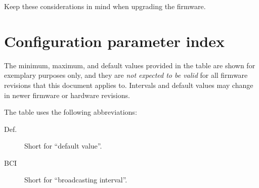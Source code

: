 \documentclass{zubaxdoc}
\begin{document}
Keep these considerations in mind when upgrading the firmware.

\section{Configuration parameter index}

The minimum, maximum, and default values provided in the table are shown for exemplary purposes only,
and they are \emph{not expected to be valid} for all firmware revisions that this document applies to.
Intervals and default values may change in newer firmware or hardware revisions.

The table uses the following abbreviations:
\begin{description}
\item[Def.] Short for ``default value''.
\item[BCI] Short for ``broadcasting interval''.
\end{description}

\newcommand\CfgParamIndexEntry[6]{%
    \CfgDef{#1} & \footnotesize{#2} & \footnotesize{\CfgListReferences{#1}} &
    \footnotesize{#3} & \footnotesize{#4} & \footnotesize{#5} & \footnotesize{#6}
    \tabularnewline
}%

\newenvironment{CfgParamIndex}[1]{%
    \begin{ZubaxTableWrapper}{#1}
    \setlength\tabcolsep{2.5pt}
    \begin{ZubaxWrappedTable}{@{} l l l | c c c | X @{}}
    Name & Unit & Pages & Min & Max & Def. & Description \\
}{%
    \end{ZubaxWrappedTable}
    \end{ZubaxTableWrapper}
}
\end{document}
